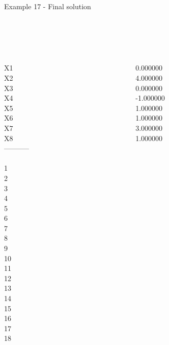 \begin{frame}{Example 17 - Final solution}

 \\
  \\

\begin{columns}[t]
\begin{column}{0.3\textwidth}
\\
X1\\
X2\\
X3\\
X4\\
X5\\
X6\\
X7\\
X8\\
-----------\\
\\
1\\
2\\
3\\
4\\
5\\
6\\
7\\
8\\
9\\
10\\
11\\
12\\
13\\
14\\
15\\
16\\
17\\
18\\

\end{column}
\begin{column}{0.3\textwidth}
\\
0.000000\\
4.000000\\
0.000000\\
-1.000000\\
1.000000\\
1.000000\\
3.000000\\
1.000000\\


\end{column}
\end{columns}
\end{frame}

